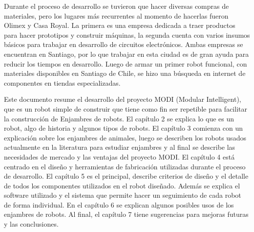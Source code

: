 Durante el proceso de desarrollo se tuvieron que hacer diversas compras de materiales, pero los lugares más recurrentes al momento de hacerlas fueron Olimex y Casa Royal. La primera es una empresa dedicada a traer productos para hacer prototipos y construir máquinas, la segunda cuenta con varios insumos básicos para trabajar en desarrollo de circuitos electrónicos. Ambas empresas se encuentran en Santiago, por lo que trabajar en esta ciudad es de gran ayuda para reducir los tiempos en desarrollo.
Luego de armar un primer robot funcional, con materiales disponibles en Santiago de Chile, se hizo una búsqueda en internet de componentes en tiendas especializadas.

Este documento resume el desarrollo del proyecto MODI (Modular Intelligent), que es un robot simple de construir que tiene como fin ser repetible para facilitar la construcción de Enjambres de robots. El capítulo 2 se explica lo que es un robot, algo de historia y algunos tipos de robots. El capítulo 3 comienza con un explicación sobre los enjambres de animales, luego se describen los robots usados actualmente en la literatura para estudiar enjambres y al final se describe las necesidades de mercado y las ventajas del proyecto MODI. El capítulo 4 está centrado en el diseño y herramientas de fabricación utilizadas durante el proceso de desarrollo. El capítulo 5 es el principal, describe criterios de diseño y el detalle de todos los componentes utilizados en el robot diseñado. Además se explica el software utilizado y el sistema que permite hacer un seguimiento de cada robot de forma individual. En el capítulo 6 se explican algunos posibles usos de los enjambres de robots. Al final, el capítulo 7 tiene sugerencias para mejoras futuras y las conclusiones.

